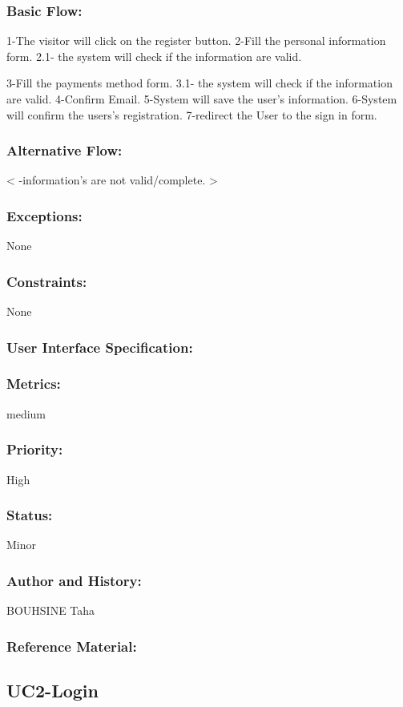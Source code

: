 \documentclass[11pt, openany]{report}
\begin{document}
\subsubsection{Basic Flow:}
1-The visitor will click on the register button.
2-Fill the personal information form.
2.1- the system will check if the information are valid.

3-Fill the payments method form.
3.1- the system will check if the information are valid.
4-Confirm Email.
5-System will save the user's information.
6-System will confirm the users's registration.
7-redirect the User to the sign in form.
\subsubsection{Alternative Flow:}
< -information's are not valid/complete. >
\subsubsection{Exceptions:}
None
\subsubsection{Constraints:}
None
\subsubsection{User Interface Specification:}
\subsubsection{Metrics:}
medium
\subsubsection{Priority:}
High
\subsubsection{Status:}
Minor
\subsubsection{Author and History:}
BOUHSINE Taha
\subsubsection{Reference Material:}


\subsection{UC2-Login}
\label{UC2}
\end{document}
